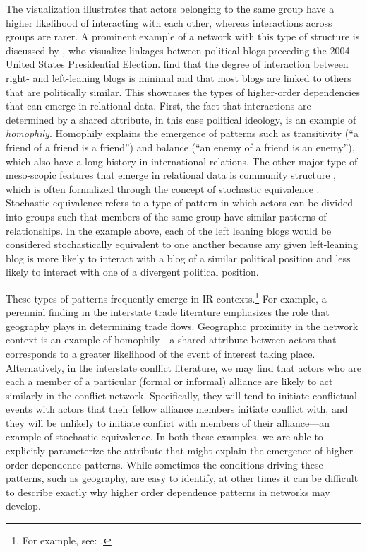 \documentclass[12pt]{amsart}
\begin{document}
The visualization illustrates that actors belonging to the same group have a higher likelihood of interacting with each other, whereas interactions across groups are rarer. A prominent example of a network with this type of structure is discussed by \citet{adamic:glance:2005}, who visualize linkages between political blogs preceding the 2004 United States Presidential Election. \citeauthor{adamic:glance:2005} find that the degree of interaction between right- and left-leaning blogs is minimal and that most blogs are linked to others that are politically similar. This showcases the types of higher-order dependencies that can emerge in relational data. First, the fact that interactions are determined by a shared attribute, in this case political ideology, is an example of \textit{homophily}. Homophily explains the emergence of patterns such as transitivity (``a friend of a friend is a friend'') and balance (``an enemy of a friend is an enemy''), which also have a long history in international relations. The other major type of meso-scopic features that emerge in relational data is community structure \citep{mucha:etal:2010}, which is often formalized through the concept of stochastic equivalence \citep{anderson:etal:1992}. Stochastic equivalence refers to a type of pattern in which actors can be divided into groups such that members of the same group have similar patterns of relationships. In the example above, each of the left leaning blogs would be considered stochastically equivalent to one another because any given left-leaning blog is more likely to interact with a blog of a similar political position and less likely to interact with one of a divergent political position.

These types of patterns frequently emerge in IR contexts.\footnote{For example, see: \citet{manger:etal:2012, kinne:2013, chyzh:2016}.} For example, a perennial finding in the interstate trade literature emphasizes the role that geography plays in determining trade flows. Geographic proximity in the network context is an example of homophily---a shared attribute between actors that corresponds to a greater likelihood of the event of interest taking place. Alternatively, in the interstate conflict literature, we may find that actors who are each a member of a particular (formal or informal) alliance are likely to act similarly in the conflict network. Specifically, they will tend to initiate conflictual events with actors that their fellow alliance members initiate conflict with, and they will be unlikely to initiate conflict with members of their alliance---an example of stochastic equivalence. In both these examples, we are able to explicitly parameterize the attribute that might explain the emergence of higher order dependence patterns. While sometimes the conditions driving these patterns, such as geography, are easy to identify, at other times it can be difficult to describe exactly why higher order dependence patterns in networks may develop.
\end{document}
